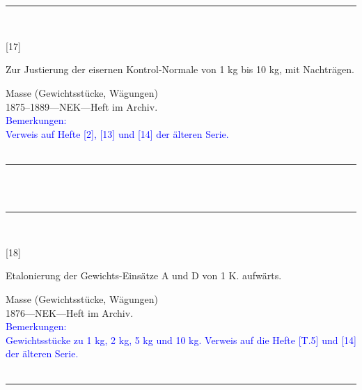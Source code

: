 \\
\vspace*{-2.5pt}\\
\parbox{\textwidth}{%
\rule{\textwidth}{1pt}\vspace*{-3mm}\\
\begin{minipage}[t]{0.15\textwidth}\vspace{0pt}
\Huge\rule[-4mm]{0cm}{1cm}[17]
\end{minipage}
\hfill
\begin{minipage}[t]{0.85\textwidth}\vspace{0pt}
\large Zur Justierung der eisernen Kontrol-Normale von 1 kg bis 10 kg, mit Nachträgen.\rule[-2mm]{0mm}{2mm}
\end{minipage}
{\footnotesize\flushright
Masse (Gewichtsstücke, Wägungen)\\
}
1875--1889\quad---\quad NEK\quad---\quad Heft im Archiv.\\
\textcolor{blue}{Bemerkungen:\\{}
Verweis auf Hefte [2], [13] und [14] der älteren Serie.\\{}
}
\\[-15pt]
\rule{\textwidth}{1pt}
}
\\
\vspace*{-2.5pt}\\
\parbox{\textwidth}{%
\rule{\textwidth}{1pt}\vspace*{-3mm}\\
\begin{minipage}[t]{0.15\textwidth}\vspace{0pt}
\Huge\rule[-4mm]{0cm}{1cm}[18]
\end{minipage}
\hfill
\begin{minipage}[t]{0.85\textwidth}\vspace{0pt}
\large Etalonierung der Gewichts-Einsätze A und D von 1 K. aufwärts.\rule[-2mm]{0mm}{2mm}
\end{minipage}
{\footnotesize\flushright
Masse (Gewichtsstücke, Wägungen)\\
}
1876\quad---\quad NEK\quad---\quad Heft im Archiv.\\
\textcolor{blue}{Bemerkungen:\\{}
Gewichtsstücke zu 1 kg, 2 kg, 5 kg und 10 kg. Verweis auf die Hefte [T.5] und [14] der älteren Serie.\\{}
}
\\[-15pt]
\rule{\textwidth}{1pt}
}
